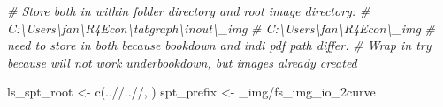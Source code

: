 \documentclass[
]{book}
\newenvironment{Shaded}{\begin{snugshade}}{\end{snugshade}}
\newcommand{\CommentTok}[1]{\textcolor[rgb]{0.56,0.35,0.01}{\textit{#1}}}
\newcommand{\FunctionTok}[1]{\textcolor[rgb]{0.00,0.00,0.00}{#1}}
\newcommand{\NormalTok}[1]{#1}
\newcommand{\OtherTok}[1]{\textcolor[rgb]{0.56,0.35,0.01}{#1}}
\newcommand{\StringTok}[1]{\textcolor[rgb]{0.31,0.60,0.02}{#1}}
\begin{document}
\begin{Shaded}
\begin{Highlighting}[]
\CommentTok{\# Store both in within folder directory and root image directory:}
\CommentTok{\# C:\textbackslash{}Users\textbackslash{}fan\textbackslash{}R4Econ\textbackslash{}tabgraph\textbackslash{}inout\textbackslash{}\_img}
\CommentTok{\# C:\textbackslash{}Users\textbackslash{}fan\textbackslash{}R4Econ\textbackslash{}\_img}
\CommentTok{\# need to store in both because bookdown and indi pdf path differ.}
\CommentTok{\# Wrap in try because will not work underbookdown, but images already created}

\NormalTok{ls\_spt\_root }\OtherTok{\textless{}{-}} \FunctionTok{c}\NormalTok{(}\StringTok{\textquotesingle{}..//..//\textquotesingle{}}\NormalTok{, }\StringTok{\textquotesingle{}\textquotesingle{}}\NormalTok{)}
\NormalTok{spt\_prefix }\OtherTok{\textless{}{-}} \StringTok{\textquotesingle{}\_img/fs\_img\_io\_2curve\textquotesingle{}}


\end{Highlighting}
\end{Shaded}
\end{document}
